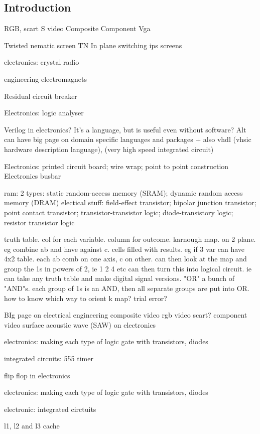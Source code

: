 
\subsection{Introduction}

RGB, scart
S video
Composite
Component
Vga

Twisted nematic screen TN
In plane switching ips screens

electronics: crystal radio

engineering
	electromagnets

Residual circuit breaker

Electronics: logic analyser

Verilog in electronics? It's a language, but is useful even without software? Alt can have big page on domain specific languages and packages
+ also vhdl (vhsic hardware description language), (very high speed integrated circuit)

Electronics: printed circuit board; wire wrap; point to point construction
Electronics busbar

ram: 2 types: static random-access memory (SRAM); dynamic random access memory (DRAM)
electical stuff: field-effect transistor; bipolar junction transistor; point contact transistor;
transistor-transistor logic; diode-transistory logic; resistor transistor logic

truth table. col for each variable. column for outcome.
karnough map. on 2 plane. eg combine ab and have against c. cells filled with results.
eg if 3 var can have 4x2 table. each ab comb on one axis, c on other.
can then look at the map and group the 1s in powers of 2, ie 1 2 4 etc
can then turn this into logical circuit. ie can take any truth table and make digital signal versions.
"OR" a bunch of "AND"s. each group of 1s is an AND, then all separate groups are put into OR. how to know which way to orient k map? trial error?

BIg page on electrical engineering
composite video
rgb video
scart?
component video
surface acoustic wave (SAW) on electronics

electronics: making each type of logic gate with transistors, diodes

integrated circuits: 555 timer

flip flop in electronics


electronics: making each type of logic gate with transistors, diodes

electronic: integrated circtuits

l1, l2 and l3 cache

